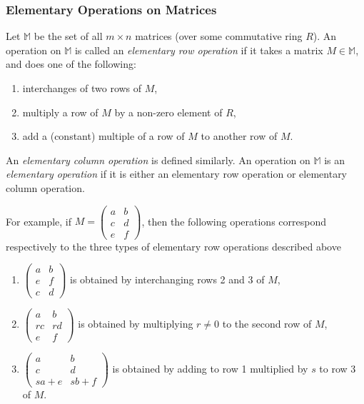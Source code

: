 \documentclass[12pt]{article}
\begin{document}
\subsubsection*{Elementary Operations on Matrices}

Let $\mathbb{M}$ be the set of all $m\times n$ matrices (over some commutative ring $R$).  An operation on $\mathbb{M}$ is called an \emph{elementary row operation} if it takes a matrix $M\in \mathbb{M}$, and does one of the following:
\begin{enumerate}
\item interchanges of two rows of $M$,
\item multiply a row of $M$ by a non-zero element of $R$,
\item add a (constant) multiple of a row of $M$ to another row of $M$.
\end{enumerate}
An \emph{elementary column operation} is defined similarly.  An operation on $\mathbb{M}$ is an \emph{elementary operation} if it is either an elementary row operation or elementary column operation.

For example, if $M=\begin{pmatrix} a & b \\ c & d \\ e & f \end{pmatrix}$, then the following operations correspond respectively to the three types of elementary row operations described above
\begin{enumerate}
\item $\begin{pmatrix} a & b \\ e & f \\ c & d \end{pmatrix}$ is obtained by interchanging rows 2 and 3 of $M$,
\item $\begin{pmatrix} a & b \\ rc & rd \\ e & f \end{pmatrix}$ is obtained by multiplying $r\ne 0$ to the second row of $M$,
\item $\begin{pmatrix} a & b \\ c & d \\ sa+e & sb+f \end{pmatrix}$ is obtained by adding to row 1 multiplied by $s$ to row 3 of $M$.
\end{enumerate}
\end{document}
